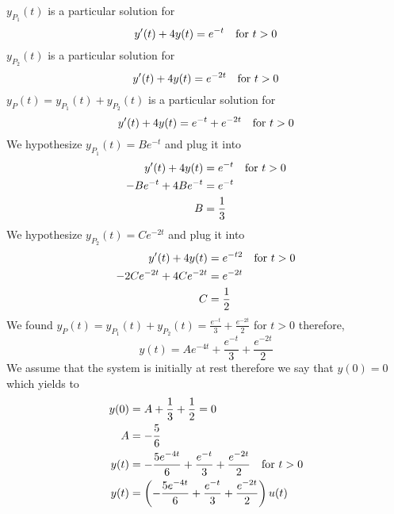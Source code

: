\documentclass[10pt,a4paper, margin=1in]{article}
\begin{document}
\begin{enumerate}
\begin{enumerate}
	$y_{P_1}(t)$ is a particular solution for 
	\begin{equation}
	y'(t) + 4y(t) = e^{-t} \text{\quad for } t>0 
	\end{equation}
	$y_{P_2}(t)$ is a particular solution for 	
	\begin{equation}
	y'(t) + 4y(t) = e^{-2t} \text{\quad for } t>0 
	\end{equation}
    	$y_P(t)=y_{P_1}(t)+y_{P_2}(t)$ is a particular solution for 
	\begin{equation}
	y'(t) + 4y(t) = e^{-t}+e^{-2t} \text{\quad for } t>0 
	\end{equation}
	We hypothesize $y_{P_1}(t)=Be^{-t}$ and plug it into 
	\begin{equation}
	\begin{split}
	y'(t) + 4y(t) & = e^{-t} \text{\quad for } t>0 \\
	-Be^{-t}+4Be^{-t} & = e^{-t} \\
	B &= \frac{1}{3}
	\end{split}
	\end{equation}
	We hypothesize $y_{P_2}(t)=Ce^{-2t}$ and plug it into 
	\begin{equation}
	\begin{split}
	y'(t) + 4y(t) & = e^{-t2} \text{\quad for } t>0 \\
	-2Ce^{-2t}+4Ce^{-2t} & = e^{-2t} \\
	C &= \frac{1}{2}
	\end{split}
	\end{equation}
	We found $y_P(t)=y_{P_1}(t)+y_{P_2}(t)=\frac{e^{-t}}{3}+\frac{e^{-2t}}{2}$ for $t>0$ therefore,
	\begin{equation}
	y(t) = Ae^{-4t} + \frac{e^{-t}}{3}+\frac{e^{-2t}}{2}
	\end{equation}
	We assume that the system is initially at rest therefore we say that $y(0)=0$ which yields to
	\begin{equation}
	\begin{split}
	y(0) & = A + \frac{1}{3} + \frac{1}{2} = 0 \\
	A & = - \frac{5}{6} \\
	y(t) & = - \frac{5e^{-4t}}{6}  + \frac{e^{-t}}{3}+\frac{e^{-2t}}{2} \text{\quad for } t>0\\
	y(t) & = \left( - \frac{5e^{-4t}}{6}  + \frac{e^{-t}}{3}+\frac{e^{-2t}}{2} \right) u(t)
	\end{split}
	\end{equation}
    \end{enumerate}



\end{enumerate}
\end{document}

